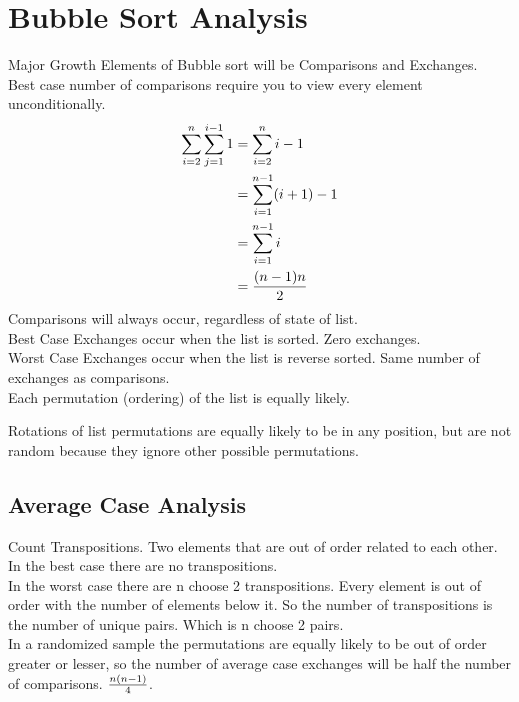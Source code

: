 \documentclass[english, 10pt]{article}
\begin{document}
\section{Bubble Sort Analysis}
\begin{algorithm}
\end{algorithm}

Major Growth Elements of Bubble sort will be Comparisons and Exchanges.\\

Best case number of comparisons require you to view every element unconditionally. \\
\begin{align*}
    \sum_{i=2}^n \sum_{j=1}^{i-1} 1 &= \sum_{i=2}^{n} i-1 \\
    &= \sum_{i=1}^{n-1} (i+1) -1 \\
    &= \sum_{i=1}^{n-1} i \\
    &= \frac{(n-1)n}{2}
\end{align*}
Comparisons will always occur, regardless of state of list. \\

Best Case Exchanges occur when the list is sorted. Zero exchanges. \\
Worst Case Exchanges occur when the list is reverse sorted. Same number of exchanges as comparisons. \\

 Each permutation (ordering) of the list is equally likely.

    Rotations of list permutations are equally likely to be in any position, but are not random because they ignore other possible permutations.\\

\subsection{Average Case Analysis}
Count Transpositions. Two elements that are out of order related to each other. \\

In the best case there are no transpositions. \\
In the worst case there are n choose 2 transpositions. Every element is out of order with the number of elements below it.
So the number of transpositions is the number of unique pairs. Which is n choose 2 pairs. \\
In a randomized sample the permutations are equally likely to be out of order greater or lesser,
so the number of average case exchanges will be half the number of comparisons. $\frac{n(n-1)}{4}$.
\end{document}
